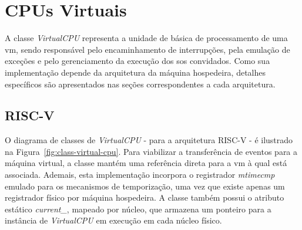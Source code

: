 \section{CPUs Virtuais}

A classe \textit{VirtualCPU} representa a unidade de básica de processamento de uma \gls{vm}, sendo responsável
pelo encaminhamento de interrupções, pela emulação de exceções e pelo gerenciamento da execução dos \glspl{so} convidados.
Como sua implementação depende da arquitetura da máquina hospedeira, detalhes específicos são apresentados
nas seções correspondentes a cada arquitetura.

\subsection{RISC-V}

O diagrama de classes de \textit{VirtualCPU} - para a arquitetura RISC-V - é ilustrado na Figura~\ref{fig:class-virtual-cpu}.
Para viabilizar a transferência de eventos para a máquina virtual, a classe mantém uma referência direta para a \gls{vm}
à qual está associada. Ademais, esta implementação incorpora o registrador \textit{mtimecmp} emulado para os mecanismos de
temporização, uma vez que existe apenas um registrador físico por máquina hospedeira.
A classe também possui o atributo estático \textit{current\_}, mapeado por núcleo, que armazena um ponteiro para a
instância de \textit{VirtualCPU} em execução em cada núcleo físico.


\vspace{1cm}

